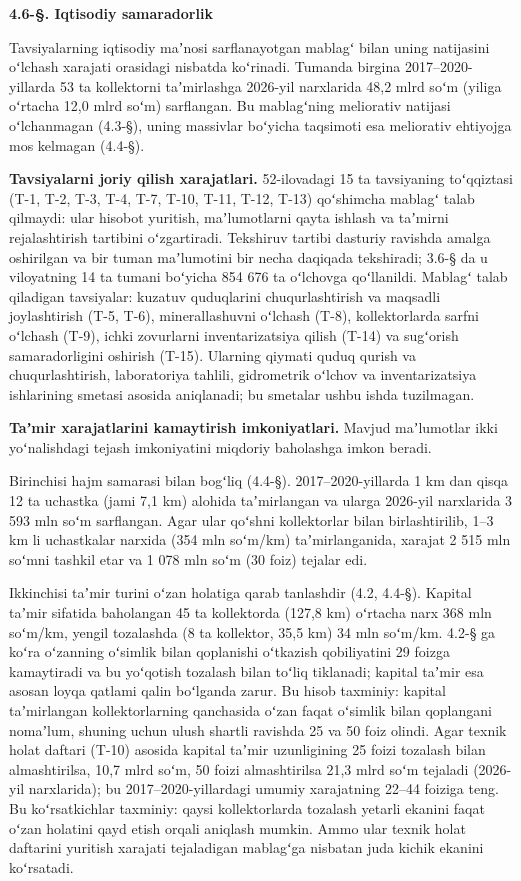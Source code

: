 \documentclass[14pt,a4paper,oneside]{extreport}
\newcommand{\oakpar}[1]{\Needspace{5\baselineskip}\phantomsection\addcontentsline{toc}{section}{#1}%
  \vspace{6pt}\begin{center}\bfseries #1\end{center}\vspace{2pt}}
\begin{document}
\oakpar{4.6-§. Iqtisodiy samaradorlik}

Tavsiyalarning iqtisodiy maʼnosi sarflanayotgan mablagʻ bilan uning
natijasini oʻlchash xarajati orasidagi nisbatda koʻrinadi. Tumanda
birgina 2017--2020-yillarda 53 ta kollektorni taʼmirlashga 2026-yil
narxlarida 48,2 mlrd soʻm (yiliga oʻrtacha 12,0 mlrd soʻm) sarflangan.
Bu mablagʻning meliorativ natijasi oʻlchanmagan (4.3-§), uning massivlar
boʻyicha taqsimoti esa meliorativ ehtiyojga mos kelmagan (4.4-§).

\textbf{Tavsiyalarni joriy qilish xarajatlari.} 52-ilovadagi 15 ta
tavsiyaning toʻqqiztasi (T-1, T-2, T-3, T-4, T-7, T-10, T-11, T-12,
T-13) qoʻshimcha mablagʻ talab qilmaydi: ular hisobot yuritish,
maʼlumotlarni qayta ishlash va taʼmirni rejalashtirish tartibini
oʻzgartiradi. Tekshiruv tartibi dasturiy ravishda amalga oshirilgan va
bir tuman maʼlumotini bir necha daqiqada tekshiradi; 3.6-§ da u
viloyatning 14 ta tumani boʻyicha 854 676 ta oʻlchovga qoʻllanildi.
Mablagʻ talab qiladigan tavsiyalar: kuzatuv quduqlarini chuqurlashtirish
va maqsadli joylashtirish (T-5, T-6), minerallashuvni oʻlchash (T-8),
kollektorlarda sarfni oʻlchash (T-9), ichki zovurlarni inventarizatsiya
qilish (T-14) va sugʻorish samaradorligini oshirish (T-15). Ularning
qiymati quduq qurish va chuqurlashtirish, laboratoriya tahlili,
gidrometrik oʻlchov va inventarizatsiya ishlarining smetasi asosida
aniqlanadi; bu smetalar ushbu ishda tuzilmagan.

\textbf{Taʼmir xarajatlarini kamaytirish imkoniyatlari.} Mavjud
maʼlumotlar ikki yoʻnalishdagi tejash imkoniyatini miqdoriy baholashga
imkon beradi.

Birinchisi hajm samarasi bilan bogʻliq (4.4-§). 2017--2020-yillarda 1 km
dan qisqa 12 ta uchastka (jami 7,1 km) alohida taʼmirlangan va ularga
2026-yil narxlarida 3 593 mln soʻm sarflangan. Agar ular qoʻshni
kollektorlar bilan birlashtirilib, 1--3 km li uchastkalar narxida (354
mln soʻm/km) taʼmirlanganida, xarajat 2 515 mln soʻmni tashkil etar va 1
078 mln soʻm (30 foiz) tejalar edi.

Ikkinchisi taʼmir turini oʻzan holatiga qarab tanlashdir (4.2, 4.4-§).
Kapital taʼmir sifatida baholangan 45 ta kollektorda (127,8 km) oʻrtacha
narx 368 mln soʻm/km, yengil tozalashda (8 ta kollektor, 35,5 km) 34 mln
soʻm/km. 4.2-§ ga koʻra oʻzanning oʻsimlik bilan qoplanishi oʻtkazish
qobiliyatini 29 foizga kamaytiradi va bu yoʻqotish tozalash bilan toʻliq
tiklanadi; kapital taʼmir esa asosan loyqa qatlami qalin boʻlganda
zarur. Bu hisob taxminiy: kapital taʼmirlangan kollektorlarning
qanchasida oʻzan faqat oʻsimlik bilan qoplangani nomaʼlum, shuning uchun
ulush shartli ravishda 25 va 50 foiz olindi. Agar texnik holat daftari
(T-10) asosida kapital taʼmir uzunligining 25 foizi tozalash bilan
almashtirilsa, 10,7 mlrd soʻm, 50 foizi almashtirilsa 21,3 mlrd soʻm
tejaladi (2026-yil narxlarida); bu 2017--2020-yillardagi umumiy
xarajatning 22--44 foiziga teng. Bu koʻrsatkichlar taxminiy: qaysi
kollektorlarda tozalash yetarli ekanini faqat oʻzan holatini qayd etish
orqali aniqlash mumkin. Ammo ular texnik holat daftarini yuritish
xarajati tejaladigan mablagʻga nisbatan juda kichik ekanini koʻrsatadi.
\end{document}
